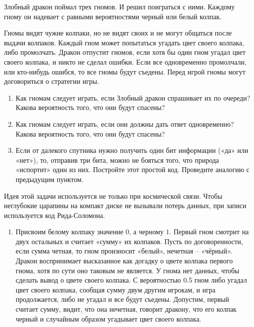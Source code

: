 \documentclass[nobib]{tufte-handout}
\theoremstyle{definition}
\newcounter{problem}
\newenvironment{problem}%
{%
\refstepcounter{problem}%
     \hypertarget{problem:{\theproblem}}{}
     \Writetofile{solution_file}{\protect\hypertarget{soln:\theproblem}{}}
     \begin{myenum}[label=\bfseries\protect\hyperlink{soln:\theproblem}{\theproblem},ref=\theproblem]
     \item%
    }%
    {%
    \end{myenum}}
\begin{document}
\begin{problem}
Злобный дракон поймал трех гномов. И решил поиграться с ними.
Каждому гному он надевает с равными вероятностями черный или белый колпак.


Гномы видят чужие колпаки, но не видят своих и не могут общаться после выдачи колпаков.
Каждый гном может попытаться угадать цвет своего колпака, либо промолчать.
Дракон отпустит гномов, если хотя бы один гном угадал цвет своего колпака,
и никто не сделал ошибки. Если все одновременно промолчали, или кто-нибудь ошибся,
то все гномы будут съедены. Перед игрой гномы могут договориться о стратегии игры.

\begin{enumerate}
\item Как гномам следует играть, если Злобный дракон спрашивает их по очереди?
Какова вероятность того, что они будут спасены?
\item Как гномам следует играть, если они должны дать ответ одновременно?
Какова вероятность того, что они будут спасены?
\item Если от далекого спутника нужно получить один бит информации («да» или «нет»),
то, отправив три бита, можно не бояться того, что природа «испортит» один из них.
Постройте этот простой код. Проведите аналогию с предыдущим пунктом.
\end{enumerate}
Идея этой задачи используется не только при космической связи.
Чтобы неглубокие царапины на компакт диске не вызывали потерь данных,
при записи используется код Рида-Соломона.

\begin{sol}
\begin{enumerate}
\item Присвоим белому колпаку значение $0$, а черному $1$. Первый гном смотрит
на двух остальных и считает «сумму» их колпаков. Пусть по договоренности,
если сумма четная, то гном произносит «белый», нечетная – «чёрный».
Дракон воспринимает высказанное как догадку о цвете колпака первого гнома,
хотя по сути оно таковым не является. У гнома нет данных,
чтобы сделать вывод о цвете своего колпака. С вероятностью 0.5 гном
либо угадал цвет своего колпака, сообщая сумму двум другим игрокам,
и игра продолжается, либо не угадал и все будут съедены.
Допустим, первый считает сумму, видит, что она нечетная, говорит дракону,
что его колпак черный и случайным образом угадывает цвет своего колпака.


\end{enumerate}
\end{sol}
\end{problem}
\end{document}

